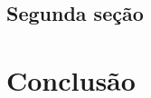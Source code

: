 \documentclass[
	12pt,                       %
	oneside,                    %
	a4paper,                    %
	chapter=TITLE,              %
	section=TITLE,              %
	brazil                      %
    sumario=tradicional         %
]{abntex2}
\begin{document}
\lipsum[20]

\section{Segunda seção}

\lipsum[50]
\lipsum[20]

\chapter*{Conclusão}

\lipsum[50]
\lipsum[50]

\postextual             %




%
%

%
%
%
%
%
%


%
%
%
%
%
%
%
%
%


\printindex
\end{document}
